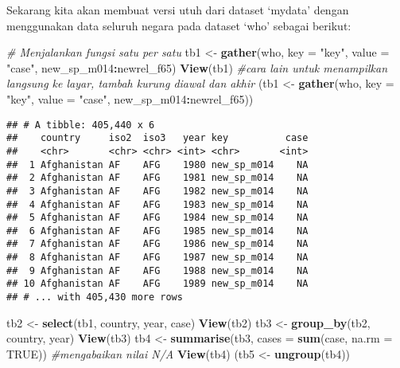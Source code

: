 \documentclass[]{article}
\newenvironment{Shaded}{\begin{snugshade}}{\end{snugshade}}
\newcommand{\CommentTok}[1]{\textcolor[rgb]{0.56,0.35,0.01}{\textit{#1}}}
\newcommand{\DataTypeTok}[1]{\textcolor[rgb]{0.13,0.29,0.53}{#1}}
\newcommand{\KeywordTok}[1]{\textcolor[rgb]{0.13,0.29,0.53}{\textbf{#1}}}
\newcommand{\NormalTok}[1]{#1}
\newcommand{\OperatorTok}[1]{\textcolor[rgb]{0.81,0.36,0.00}{\textbf{#1}}}
\newcommand{\OtherTok}[1]{\textcolor[rgb]{0.56,0.35,0.01}{#1}}
\newcommand{\StringTok}[1]{\textcolor[rgb]{0.31,0.60,0.02}{#1}}
\begin{document}
Sekarang kita akan membuat versi utuh dari dataset `mydata' dengan
menggunakan data seluruh negara pada dataset `who' sebagai berikut:

\begin{Shaded}
\begin{Highlighting}[]
\CommentTok{# Menjalankan fungsi satu per satu}
\NormalTok{tb1 <-}\StringTok{ }\KeywordTok{gather}\NormalTok{(who, }\DataTypeTok{key =} \StringTok{"key"}\NormalTok{, }\DataTypeTok{value =} \StringTok{"case"}\NormalTok{, new_sp_m014}\OperatorTok{:}\NormalTok{newrel_f65)}
\KeywordTok{View}\NormalTok{(tb1)}
\CommentTok{#cara lain untuk menampilkan langsung ke layar, tambah kurung diawal dan akhir}
\NormalTok{(tb1 <-}\StringTok{ }\KeywordTok{gather}\NormalTok{(who, }\DataTypeTok{key =} \StringTok{"key"}\NormalTok{, }\DataTypeTok{value =} \StringTok{"case"}\NormalTok{, new_sp_m014}\OperatorTok{:}\NormalTok{newrel_f65))}
\end{Highlighting}
\end{Shaded}

\begin{verbatim}
## # A tibble: 405,440 x 6
##    country     iso2  iso3   year key          case
##    <chr>       <chr> <chr> <int> <chr>       <int>
##  1 Afghanistan AF    AFG    1980 new_sp_m014    NA
##  2 Afghanistan AF    AFG    1981 new_sp_m014    NA
##  3 Afghanistan AF    AFG    1982 new_sp_m014    NA
##  4 Afghanistan AF    AFG    1983 new_sp_m014    NA
##  5 Afghanistan AF    AFG    1984 new_sp_m014    NA
##  6 Afghanistan AF    AFG    1985 new_sp_m014    NA
##  7 Afghanistan AF    AFG    1986 new_sp_m014    NA
##  8 Afghanistan AF    AFG    1987 new_sp_m014    NA
##  9 Afghanistan AF    AFG    1988 new_sp_m014    NA
## 10 Afghanistan AF    AFG    1989 new_sp_m014    NA
## # ... with 405,430 more rows
\end{verbatim}

\begin{Shaded}
\begin{Highlighting}[]
\NormalTok{tb2 <-}\StringTok{ }\KeywordTok{select}\NormalTok{(tb1, country, year, case)}
\KeywordTok{View}\NormalTok{(tb2)}
\NormalTok{tb3 <-}\StringTok{ }\KeywordTok{group_by}\NormalTok{(tb2, country, year)}
\KeywordTok{View}\NormalTok{(tb3)}
\NormalTok{tb4 <-}\StringTok{ }\KeywordTok{summarise}\NormalTok{(tb3, }\DataTypeTok{cases =} \KeywordTok{sum}\NormalTok{(case, }\DataTypeTok{na.rm =} \OtherTok{TRUE}\NormalTok{)) }\CommentTok{#mengabaikan nilai N/A}
\KeywordTok{View}\NormalTok{(tb4)}
\NormalTok{(tb5 <-}\StringTok{ }\KeywordTok{ungroup}\NormalTok{(tb4))}
\end{Highlighting}
\end{Shaded}
\end{document}
